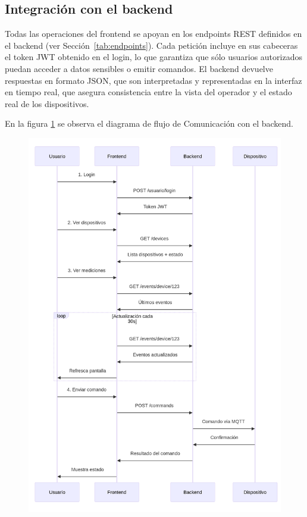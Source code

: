 \clearpage


\subsection{Integración con el backend}

Todas las operaciones del frontend se apoyan en los endpoints REST definidos en el backend (ver Sección~\ref{tab:endpoints}).  
Cada petición incluye en sus cabeceras el token JWT obtenido en el login, lo que garantiza que sólo usuarios autorizados puedan acceder a datos sensibles o emitir comandos.  
El backend devuelve respuestas en formato JSON, que son interpretadas y representadas en la interfaz en tiempo real, que asegura consistencia entre la vista del operador y el estado real de los dispositivos.

En la figura \ref{fig:diagramaflujorestapi} se observa el diagrama de flujo de Comunicación con el backend.

\begin{figure}[htbp]
 
  \centering
  \includegraphics[width=1\linewidth]{./Figures/diagFlujoRestApi.png}
  \label{fig:diagramaflujorestapi}
\end{figure}


